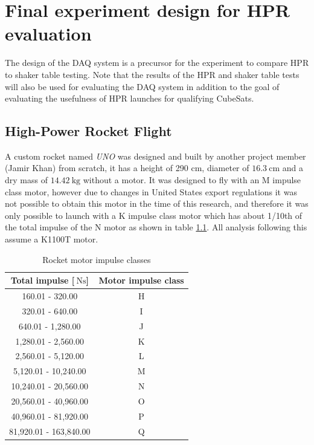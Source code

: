 \documentclass[]{report}
\begin{document}
\chapter{Final experiment design for HPR evaluation}

The design of the DAQ system is a precursor for the experiment to compare HPR to shaker table testing. Note that the results of the HPR and shaker table tests will also be used for evaluating the DAQ system in addition to the goal of evaluating the usefulness of HPR launches for qualifying CubeSats.

\section{High-Power Rocket Flight}

A custom rocket named \textit{UNO} was designed and built by another project member (Jamir Khan) from scratch, it has a height of 290 cm, diameter of $\SI{16.3}{\centi\metre}$ and a dry mass of $\SI{14.42}{\kilo\gram}$ without a motor. It was designed to fly with an M impulse class motor, however due to changes in United States export regulations it was not possible to obtain this motor in the time of this research, and therefore it was only possible to launch with a K impulse class motor which has about 1/10th of the total impulse of the N motor as shown in table \ref{tabl:impulseclasses}. All analysis following this assume a K1100T motor.

\begin{table}[H]
  \centering
  \begin{tabular}{|c|c|}
    \hline
    Total impulse [$\SI{}{\newton\second}$] & Motor impulse class \\\hline
    160.01 - 320.00                         & H                   \\
    320.01 - 640.00                         & I                   \\
    640.01 - 1,280.00                       & J                   \\
    1,280.01 - 2,560.00                     & K                   \\
    2,560.01 - 5,120.00                     & L                   \\
    5,120.01 - 10,240.00                    & M                   \\
    10,240.01 - 20,560.00                   & N                   \\
    20,560.01 - 40,960.00                   & O                   \\
    40,960.01 - 81,920.00                   & P                   \\
    81,920.01 - 163,840.00                  & Q                   \\
    \hline
  \end{tabular}
  \caption{Rocket motor impulse classes \cite{nfpa2018}}
  \label{tabl:impulseclasses}
\end{table}
\end{document}
